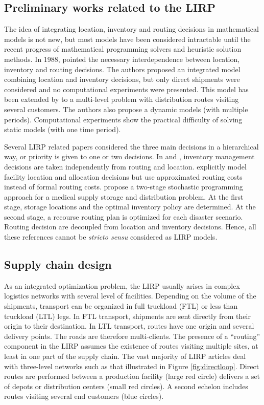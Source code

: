 \documentclass[a4paper,10pt]{article}
\begin{document}
\begin{linenumbers}
\subsection{Preliminary works related to the LIRP}
\label{sec:almost}

 The idea of integrating location, inventory and routing decisions in mathematical models is not new, but most models have been considered intractable until the recent progress of mathematical programming solvers and heuristic solution methods. 
In 1988, \cite{PerSir88} pointed the necessary interdependence between location, inventory and routing decisions. 
The authors proposed an integrated model combining location and inventory decisions, but only direct shipments were considered and no computational experiments were presented. 
This model has been extended by \cite{AmbScu05} to a multi-level problem with distribution routes visiting several customers. The authors also propose a dynamic models (with multiple periods). Computational experiments show the practical difficulty of solving static models (with one time period). 


Several LIRP related papers considered the three main decisions in a hierarchical way, or priority is given to one or two decisions. 
In \cite{LiuLee03} and \cite{LiuLin05}, inventory management decisions are taken independently from routing and location. 
\cite{Shen07} explicitly model facility location and allocation decisions but use approximated routing costs instead of formal routing costs. 
\cite{MetZab10} propose a two-stage stochastic programming approach for a medical supply
storage and distribution problem.
At the first stage, storage locations and the optimal inventory policy are determined. 
At the second stage, a recourse routing plan is optimized for each disaster scenario. 
Routing decision are decoupled from location and inventory decisions. 
Hence, all these references cannot be \textit{stricto sensu} considered as LIRP models. 

\subsection{Supply chain design}
\label{sec:l} 

As an integrated optimization problem, the LIRP usually arises in complex logistics networks with several level of facilities. 
Depending on the volume of the shipments, transport can be organized in full truckload (FTL) or less than truckload (LTL) legs. 
In FTL transport, shipments are sent directly from their origin to their destination. In LTL transport, routes have one origin and several delivery points. The roads are therefore multi-clients. The presence of a ``routing'' component in the LIRP assumes the existence of routes visiting multiple sites, at least in one part of the supply chain.
The vast majority of LIRP articles deal with three-level networks such as that illustrated in Figure \ref{fig:directloop}. 
Direct routes are performed between a production facility (large red circle) delivers a set of depots or distribution centers (small red circles). A second echelon includes routes visiting several end customers (blue circles).


\end{linenumbers}
\end{document}
